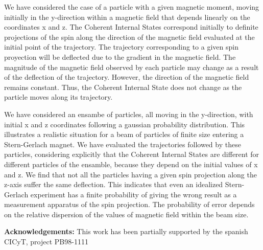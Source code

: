 We have considered the case of a particle with a given magnetic moment,
moving initially in the y-direction within a magnetic field that depends 
linearly on 
the coordinates x and z. The Coherent Internal States correspond 
initially to definite projections of the spin along the direction of the 
magnetic field 
evaluated at the initial point of the trajectory. The trajectory corresponding
to a given spin proyection will be deflected due to the gradient in the 
magnetic field. The magnitude of the magnetic field observed by each particle 
may change as a result of the deflection of the trajectory.
However, the direction of
the magnetic field remains constant. Thus, the Coherent Internal State does not
change as the particle moves along its trajectory.

We have considered an ensambe of particles, all moving in the y-direction,
with initial x and z coordinates following a gaussian probability distribution.
This illustrates a realistic situation for a beam of particles of finite size
entering a Stern-Gerlach magnet. We have evaluated the trajectories followed by
these particles, considering explicitly that the Coherent Internal States are
different for different particles of the ensamble, because they depend on
the initial values of x and z. We find that not all the particles having a 
given spin projection along the z-axis suffer the same deflection. 
This indicates that even
an idealized Stern-Gerlach experiment has a finite probability of giving
the wrong result as a measurement apparatus of the spin projection. The
probability of error depends on the relative dispersion of the values of 
magnetic field within the beam size.

\bigskip

{\bf Acknowledgements:} This work has been partially supported by the
spanish CICyT, project PB98-1111 

